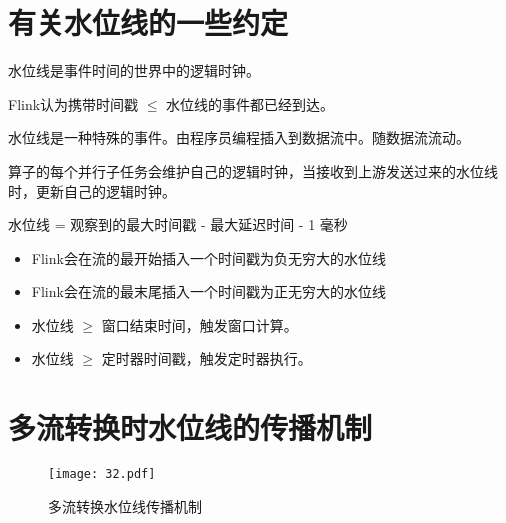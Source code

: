 \documentclass[cn,11pt,chinese]{elegantbook}
\begin{document}
\section{有关水位线的一些约定}

\begin{theorem}{}{}
  水位线是事件时间的世界中的逻辑时钟。
\end{theorem}

\begin{theorem}{}{}
  Flink认为携带时间戳 $\le$ 水位线的事件都已经到达。
\end{theorem}

\begin{theorem}{}{}
  水位线是一种特殊的事件。由程序员编程插入到数据流中。随数据流流动。
\end{theorem}

\begin{theorem}{}{}
  算子的每个并行子任务会维护自己的逻辑时钟，当接收到上游发送过来的水位线时，更新自己的逻辑时钟。
\end{theorem}

\begin{theorem}{}{}
  水位线 = 观察到的最大时间戳 - 最大延迟时间 - 1 毫秒
\end{theorem}

\begin{theorem}{}{}
  \begin{itemize}
    \item Flink会在流的最开始插入一个时间戳为负无穷大的水位线
    \item Flink会在流的最末尾插入一个时间戳为正无穷大的水位线
  \end{itemize}
\end{theorem}

\begin{theorem}{}{}
  \begin{itemize}
    \item 水位线 $\ge$ 窗口结束时间，触发窗口计算。
    \item 水位线 $\ge$ 定时器时间戳，触发定时器执行。
  \end{itemize}
\end{theorem}

\section{多流转换时水位线的传播机制}

\begin{figure}[htbp]
  \centering
  \texttt{[image: 32.pdf]}
  \caption{多流转换水位线传播机制}
\end{figure}
\end{document}
